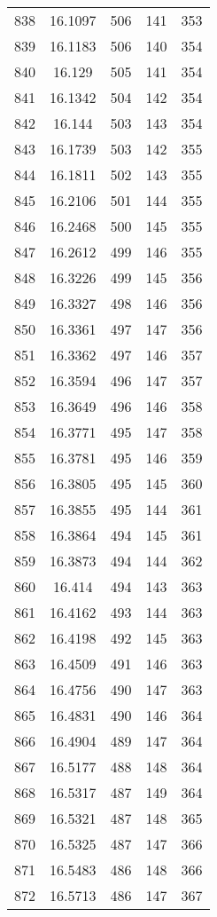 \documentclass[12pt,a4paper]{article}
\begin{document}
\begin{tabular}{r|cccc}
	838 & 16.1097 & 506 & 141 & 353 \\
	839 & 16.1183 & 506 & 140 & 354 \\
	840 & 16.129 & 505 & 141 & 354 \\
	841 & 16.1342 & 504 & 142 & 354 \\
	842 & 16.144 & 503 & 143 & 354 \\
	843 & 16.1739 & 503 & 142 & 355 \\
	844 & 16.1811 & 502 & 143 & 355 \\
	845 & 16.2106 & 501 & 144 & 355 \\
	846 & 16.2468 & 500 & 145 & 355 \\
	847 & 16.2612 & 499 & 146 & 355 \\
	848 & 16.3226 & 499 & 145 & 356 \\
	849 & 16.3327 & 498 & 146 & 356 \\
	850 & 16.3361 & 497 & 147 & 356 \\
	851 & 16.3362 & 497 & 146 & 357 \\
	852 & 16.3594 & 496 & 147 & 357 \\
	853 & 16.3649 & 496 & 146 & 358 \\
	854 & 16.3771 & 495 & 147 & 358 \\
	855 & 16.3781 & 495 & 146 & 359 \\
	856 & 16.3805 & 495 & 145 & 360 \\
	857 & 16.3855 & 495 & 144 & 361 \\
	858 & 16.3864 & 494 & 145 & 361 \\
	859 & 16.3873 & 494 & 144 & 362 \\
	860 & 16.414 & 494 & 143 & 363 \\
	861 & 16.4162 & 493 & 144 & 363 \\
	862 & 16.4198 & 492 & 145 & 363 \\
	863 & 16.4509 & 491 & 146 & 363 \\
	864 & 16.4756 & 490 & 147 & 363 \\
	865 & 16.4831 & 490 & 146 & 364 \\
	866 & 16.4904 & 489 & 147 & 364 \\
	867 & 16.5177 & 488 & 148 & 364 \\
	868 & 16.5317 & 487 & 149 & 364 \\
	869 & 16.5321 & 487 & 148 & 365 \\
	870 & 16.5325 & 487 & 147 & 366 \\
	871 & 16.5483 & 486 & 148 & 366 \\
	872 & 16.5713 & 486 & 147 & 367 \\

\end{tabular}
\end{document}
